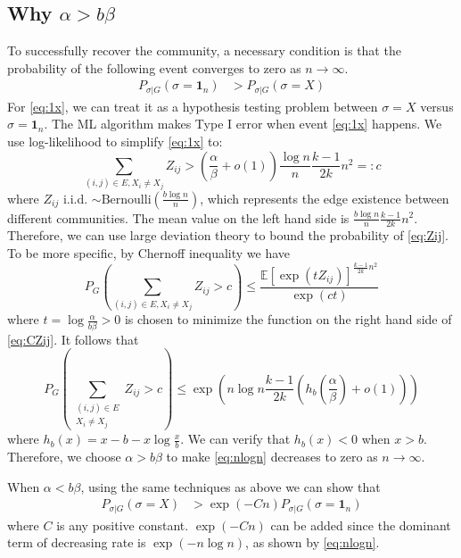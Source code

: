 \documentclass{article}
\begin{document}
\subsection{Why $\alpha > b \beta$}
To successfully recover the community, a necessary condition is that the probability of the following event converges to zero as $n\to\infty$.
\begin{align}
P_{\sigma | G}(\sigma =  \mathbf{1}_n) & > P_{\sigma | G}(\sigma = X) \label{eq:1x}
\end{align}
For \eqref{eq:1x}, we can treat it as a hypothesis testing problem between $\sigma = X$ versus $\sigma = \mathbf{1}_n$.
The ML algorithm makes Type I error when event \eqref{eq:1x} happens. We use log-likelihood to simplify
\eqref{eq:1x} to:
\begin{equation}\label{eq:Zij}
\sum_{(i,j)\in E, X_i \neq X_j} Z_{ij} > (\frac{\alpha}{\beta} + o(1)) \frac{\log n}{n} \frac{k-1}{2k}n^2 =: c
\end{equation}
where $Z_{ij}$ i.i.d. $\sim \textrm{Bernoulli}(\frac{b\log n }{n})$, which represents the edge existence between different communities. The mean value on the left hand side is $\frac{b \log n }{n} \frac{k-1}{2k}n^2$. Therefore, we can use large
deviation theory to bound the probability of \eqref{eq:Zij}. To be more specific, by Chernoff inequality we have
\begin{equation}\label{eq:CZij}
P_G\left(\sum_{(i,j)\in E, X_i \neq X_j} Z_{ij} >  c \right)\leq \frac{\mathbb{E}[\exp(t Z_{ij})]^{ \frac{k-1}{2k}n^2 }}{\exp(ct)}
\end{equation}
where $ t  = \log \frac{\alpha}{b\beta} > 0$ is chosen to minimize the function on the right hand side of \eqref{eq:CZij}. It follows that
\begin{equation}\label{eq:nlogn}
P_G(\sum_{\substack{(i,j)\in E \\ X_i \neq X_j}} Z_{ij} >  c )\leq \exp(n\log n  \frac{k-1}{2k} (h_b(\frac{\alpha}{\beta}) + o(1)))
\end{equation}
where $h_b(x) = x - b - x \log\frac{x}{b}$. We can verify that $h_b(x) < 0 $ when $ x > b$.
Therefore, we choose $\alpha > b \beta$	to make \eqref{eq:nlogn} decreases to zero as $n\to\infty$.

When $\alpha < b \beta$, using the same techniques as above we can show that
\begin{align}
P_{\sigma | G}(\sigma = X ) & > \exp(-Cn) P_{\sigma | G}(\sigma = \mathbf{1}_n) \label{eq:1x_e}
\end{align}
where $C$ is any positive constant.
$\exp(-Cn)$ can be added since the dominant term of decreasing rate is $\exp(-n\log n)$, as shown by \eqref{eq:nlogn}.
\end{document}
